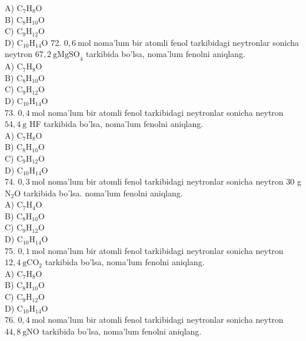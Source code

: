 A) $\mathrm{C}_{7} \mathrm{H}_{8} \mathrm{O}$\\
B) $\mathrm{C}_{8} \mathrm{H}_{10} \mathrm{O}$\\
C) $\mathrm{C}_{9} \mathrm{H}_{12} \mathrm{O}$\\
D) $\mathrm{C}_{10} \mathrm{H}_{14} \mathrm{O}$
72. $0,6 \mathrm{~mol}$ noma'lum bir atomli fenol tarkibidagi neytronlar sonicha neytron $67,2 \mathrm{~g} \mathrm{MgSO}_{4}$ tarkibida bo'lsa, noma'lum fenolni aniqlang.\\
A) $\mathrm{C}_{7} \mathrm{H}_{8} \mathrm{O}$\\
B) $\mathrm{C}_{8} \mathrm{H}_{10} \mathrm{O}$\\
C) $\mathrm{C}_{9} \mathrm{H}_{12} \mathrm{O}$\\
D) $\mathrm{C}_{10} \mathrm{H}_{14} \mathrm{O}$\\
73. $0,4 \mathrm{~mol}$ noma'lum bir atomli fenol tarkibidagi neytronlar sonicha neytron $54,4 \mathrm{~g}$ HF tarkibida bo'lsa, noma'lum fenolni aniqlang.\\
A) $\mathrm{C}_{7} \mathrm{H}_{8} \mathrm{O}$\\
B) $\mathrm{C}_{8} \mathrm{H}_{10} \mathrm{O}$\\
C) $\mathrm{C}_{9} \mathrm{H}_{12} \mathrm{O}$\\
D) $\mathrm{C}_{10} \mathrm{H}_{14} \mathrm{O}$\\
74. $0,3 \mathrm{~mol}$ noma'lum bir atomli fenol tarkibidagi neytronlar sonicha neytron 30 g $\mathrm{N}_{2} \mathrm{O}$ tarkibida bo'lsa. noma'lum fenolni aniqlang.\\
A) $\mathrm{C}_{7} \mathrm{H}_{4} \mathrm{O}$\\
B) $\mathrm{C}_{8} \mathrm{H}_{10} \mathrm{O}$\\
C) $\mathrm{C}_{9} \mathrm{H}_{12} \mathrm{O}$\\
D) $\mathrm{C}_{10} \mathrm{H}_{14} \mathrm{O}$\\
75. $0,1 \mathrm{~mol}$ noma'lum bir atomli fenol tarkibidagi neytronlar sonicha neytron $12,4 \mathrm{~g} \mathrm{CO}_{2}$ tarkibida bo'lsa, noma'lum fenolni aniqlang.\\
A) $\mathrm{C}_{7} \mathrm{H}_{8} \mathrm{O}$\\
B) $\mathrm{C}_{8} \mathrm{H}_{10} \mathrm{O}$\\
C) $\mathrm{C}_{9} \mathrm{H}_{12} \mathrm{O}$\\
D) $\mathrm{C}_{10} \mathrm{H}_{14} \mathrm{O}$\\
76. $0,4 \mathrm{~mol}$ noma'lum bir atomli fenol tarkibidagi neytronlar sonicha neytron $44,8 \mathrm{~g} \mathrm{NO}$ tarkibida bo'lsa, noma'lum fenolni aniqlang.\\
